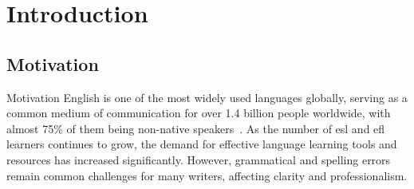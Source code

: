 \section{Introduction}

\subsection{Motivation}
\begin{frame}{Motivation}
  English is one of the most widely used languages globally, serving as a common medium of communication for over 1.4 billion people worldwide, with almost 75\% of them being non-native speakers~\cite{eberhard2015ethnologue}.
  As the number of esl and efl learners continues to grow, the demand for effective language learning tools and resources has increased significantly.
  However, grammatical and spelling errors remain common challenges for many writers, affecting clarity and professionalism.
\end{frame}
